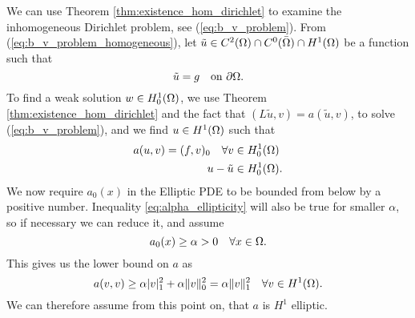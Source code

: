 We can use Theorem \ref{thm:existence_hom_dirichlet} to examine the inhomogeneous Dirichlet problem, 
see (\ref{eq:b_v_problem}). From (\ref{eq:b_v_problem_homogeneous}), let 
$\tilde{u} \in C^2(\Omega)\cap C^0(\bar{\Omega}) \cap H^1(\Omega)$ be a function such that 
\begin{equation*}
   \tilde{u} = g \quad \text{on } \partial \Omega.
\end{equation*}
To find a weak solution $w \in H_0^1(\Omega)$, we use Theorem \ref{thm:existence_hom_dirichlet} and the 
fact that $(L\tilde{u},v) = a(\tilde{u},v)$, to solve (\ref{eq:b_v_problem}), and
we find $u \in H^1(\Omega)$ such that 
\begin{align*}
   a(u,v) = (f,v)_0 \quad \forall v &\in H_0^1(\Omega) \\
   u-\tilde{u} & \in H_0^1(\Omega).
\end{align*}
We now require $a_0(x)$ in the Elliptic PDE to be bounded from below by a positive number. 
Inequality \eqref{eq:alpha_ellipticity} will also be true for smaller $\alpha$, so if 
necessary we can reduce it, and assume 
\begin{equation*}
  a_0(x) \geq \alpha >0 \quad \forall x \in \Omega.
\end{equation*}
This gives us the lower bound on $a$ as 
\begin{equation*}
   a(v,v)  \geq \alpha |v|^2_1 + \alpha \|v\|^2_0 = \alpha \|v\|^2_1 \quad \forall v \in H^1(\Omega).
\end{equation*}
We can therefore assume from this point on, that $a$ is $H^1$ elliptic.